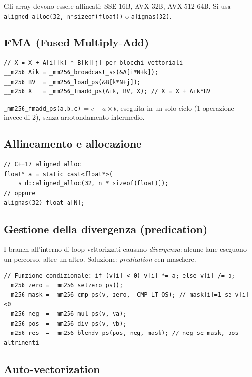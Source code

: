 \documentclass[11pt,a4paper]{article}
\theoremstyle{remark}
\begin{document}
Gli array devono essere allineati: SSE 16B, AVX 32B, AVX-512 64B. Si usa \texttt{aligned\_alloc(32, n*sizeof(float))} o \texttt{alignas(32)}.

\subsection{FMA (Fused Multiply-Add)}

\begin{lstlisting}
// X = X + A[i][k] * B[k][j] per blocchi vettoriali
__m256 Aik = _mm256_broadcast_ss(&A[i*N+k]);
__m256 BV  = _mm256_load_ps(&B[k*N+j]);
__m256 X   = _mm256_fmadd_ps(Aik, BV, X); // X = X + Aik*BV
\end{lstlisting}

\texttt{\_mm256\_fmadd\_ps(a,b,c)} = $c + a \times b$, eseguita in un solo ciclo (1 operazione invece di 2), senza arrotondamento intermedio.

\subsection{Allineamento e allocazione}

\begin{lstlisting}
// C++17 aligned alloc
float* a = static_cast<float*>(
    std::aligned_alloc(32, n * sizeof(float)));
// oppure
alignas(32) float a[N];
\end{lstlisting}

\subsection{Gestione della divergenza (predication)}

I branch all'interno di loop vettorizzati causano \emph{divergenza}: alcune lane eseguono un percorso, altre un altro. Soluzione: \emph{predication} con maschere.

\begin{lstlisting}
// Funzione condizionale: if (v[i] < 0) v[i] *= a; else v[i] /= b;
__m256 zero = _mm256_setzero_ps();
__m256 mask = _mm256_cmp_ps(v, zero, _CMP_LT_OS); // mask[i]=1 se v[i]<0
__m256 neg  = _mm256_mul_ps(v, va);
__m256 pos  = _mm256_div_ps(v, vb);
__m256 res  = _mm256_blendv_ps(pos, neg, mask); // neg se mask, pos altrimenti
\end{lstlisting}

\subsection{Auto-vectorization}
\end{document}
